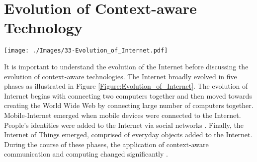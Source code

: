 \documentclass[journal]{IEEEtran}
\begin{document}
 \section{Evolution of Context-aware Technology}
 \label{sec:Evolution}
 
 
 \begin{figure*}[!t]
  \centering
\texttt{[image: ./Images/33-Evolution\_of\_Internet.pdf]}
 \vspace{-0.33cm}	
  \caption{Evolution of the Internet in five phases. The evolution of Internet begins with connecting two computers together and then moved towards creating  World Wide Web by connecting large number of computers together. The mobile-Internet emerged by connecting mobile devices to the Internet. Then, peoples'  identities joined the Internet via social networks. Finally, it is moving towards Internet of Things by connecting every day objects to the Internet}
  \label{Figure:Evolution_of_Internet}	
 \vspace{-0.4cm}	
 \end{figure*}
 
 
 
 
 
 
 
 
 

 
 
It is important to understand the evolution of the Internet before discussing the evolution of context-aware technologies. The Internet broadly evolved in five phases as illustrated in Figure \ref{Figure:Evolution_of_Internet}. The evolution of Internet begins with connecting two computers together and then moved towards creating the World Wide Web by connecting large number of computers together. Mobile-Internet emerged when mobile devices were connected to the Internet. People's identities were added to the Internet via social networks \cite{NP001}. Finally, the Internet of Things emerged, comprised of everyday objects added to the Internet. During the course of these phases, the application of context-aware communication and computing changed significantly \cite{ZMP007}.
\end{document}
